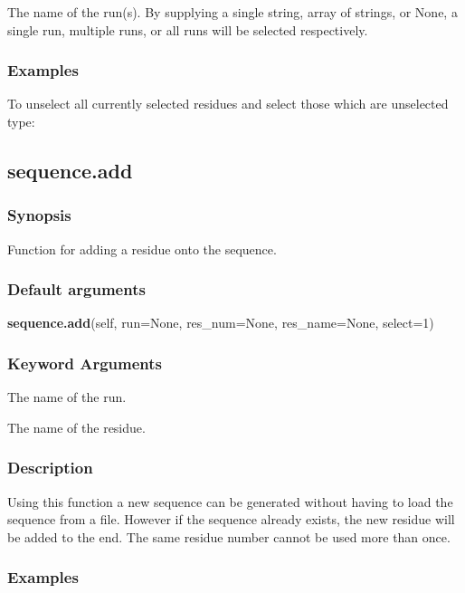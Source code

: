   The name of the run(s).  By supplying a single string, array of strings, or None, a single run, multiple runs, or all runs will be selected respectively.

\subsubsection{Examples}

To unselect all currently selected residues and select those which are unselected type:




\newpage

\subsection{sequence.add}


\subsubsection{Synopsis}

Function for adding a residue onto the sequence.

\subsubsection{Default arguments}

\textsf{\textbf{sequence.add}(self, run=None, res\_num=None, res\_name=None, select=1)}


\subsubsection{Keyword Arguments}

  The name of the run.

  The name of the residue.


\subsubsection{Description}

Using this function a new sequence can be generated without having to load the sequence from
a file.  However if the sequence already exists, the new residue will be added to the end.
The same residue number cannot be used more than once.


\subsubsection{Examples}

